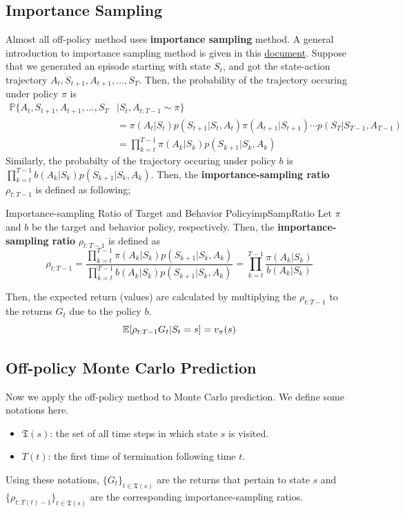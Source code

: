\documentclass[../../main.tex]{subfiles}
\begin{document}
    \subsection{Importance Sampling}
        Almost all off-policy method uses \textbf{importance sampling} method. A general introduction to importance sampling method is given in this \href{run:../../../03_bayesian_ml/inference/sampling/sampling.pdf}{document}.
        Suppose that we generated an episode starting with state $S_t$, and got the state-action trajectory $A_t, S_{t+1}, A_{t+1},\dots,S_T$.
        Then, the probability of the trajectory occuring under policy $\pi$ is
        \begin{align}
            \mathbb{P}\{A_t, S_{t+1}, A_{t+1}, \dots, S_T &| S_t, A_{t:T-1} \sim \pi \} \\
            &= \pi(A_t|S_t)p(S_{t+1}|S_t, A_t)\pi(A_{t+1}|S_{t+1})\cdots p(S_T|S_{T-1},A_{T-1}) \\
            &= \prod_{k=t}^{T-1}\pi(A_k|S_k)p(S_{k+1}|S_k,A_k)
        \end{align}
        Similarly, the probabilty of the trajectory occuring under policy $b$ is $\prod_{k=t}^{T-1}b(A_k|S_k)p(S_{k+1}|S_k,A_k)$.
        Then, the \textbf{importance-sampling ratio} $\rho_{t:T-1}$ is defined as following;
        \begin{defn}{Importance-sampling Ratio of Target and Behavior Policy}{impSampRatio}
            Let $\pi$ and $b$ be the target and behavior policy, respectively. Then, the \textbf{importance-sampling ratio}
            $\rho_{t:T-1}$ is defined as
            \begin{equation}
                \rho_{t:T-1}=\frac{\prod_{k=t}^{T-1}\pi(A_k|S_k)p(S_{k+1}|S_k,A_k)}{\prod_{k=t}^{T-1}b(A_k|S_k)p(S_{k+1}|S_k,A_k)}
                =\prod_{k=t}^{T-1}\frac{\pi(A_k|S_k)}{b(A_k|S_k)}
            \end{equation}
        \end{defn}
        Then, the expected return (values) are calculated by multiplying the $\rho_{t:T-1}$ to the returns $G_t$ due to the policy $b$.
        \begin{equation}
            \mathbb{E}[\rho_{t:T-1}G_t|S_t=s] = v_\pi(s)
        \end{equation}

    \subsection{Off-policy Monte Carlo Prediction}
        Now we apply the off-policy method to Monte Carlo prediction. We define some notations here.
        \begin{itemize}
            \item $\mathfrak{T} (s)$: the set of all time steps in which state $s$ is visited.
            \item $T(t)$: the first time of termination following time $t$.
        \end{itemize}
        Using these notations, $\{G_t\}_{t \in \mathfrak{T} (s)}$ are the returns that pertain to state $s$ and $\{\rho_{t:T(t)-1}\}_{t \in \mathfrak{T} (s)}$ are the corresponding
        importance-sampling ratios.
\end{document}
